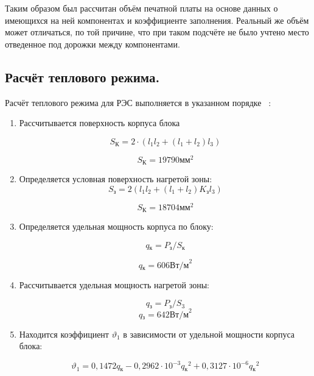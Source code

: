 Таким образом был рассчитан объём печатной платы на основе данных о
имеющихся на ней компонентах и коэффициенте заполнения.
Реальный же объём может отличаться, по той причине, что при таком
подсчёте не было учтено место отведенное под дорожки между
компонентами.

\subsection{Расчёт теплового режима.} 
Расчёт теплового режима для РЭС выполняется в указанном порядке ~\cite{Rotkop1976}:
\begin{enumerate}
  
\item Рассчитывается поверхность корпуса блока

  \begin{equation}
    S\mathrm{_{К}} = 2 \cdot (l_1 l_2 + (l_1+ l_2)l_3) %
  \end{equation}

  $$ S\mathrm{_{К}} = 19790 \textrm{мм}^2 $$
\item Определяется условная поверхность нагретой зоны:
  \begin{equation}
    S\mathrm{_{з}} = 2 (l_1 l_2 + (l_1 + l_2) K\mathrm{_{з}} l_3 ) %
  \end{equation}

    $$ S\mathrm{_{К}} = 18704 \textrm{мм}^2 $$
\item Определяется удельная мощность корпуса по блоку:

\begin{equation}
  q\mathrm{_к} = P\mathrm{_з}/S\mathrm{_к} %
\end{equation}

$$q\mathrm{_к} = 606 \textrm{Вт/м}^2 $$

\item Рассчитывается удельная мощность нагретой зоны:
  
  \begin{equation}
      q\mathrm{_з} = P\mathrm{_з}/S\mathrm{_3} %
    \end{equation}
$$q\mathrm{_з} = 642 \textrm{Вт/м}^2 $$

\item Находится коэффициент $\vartheta_1$ в зависимости от удельной мощности корпуса блока:
    
\begin{equation}
\vartheta_1 = 0,1472q\mathrm{_к} - 0,2962 \cdot 10^{-3}q\mathrm{_к}^2 + 0,3127 \cdot 10^{-6}q\mathrm{_к}^2
\end{equation}


\end{enumerate}
